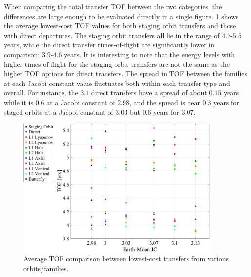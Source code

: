 When comparing the total transfer TOF between the two categories, the differences are large enough
to be evaluated directly in a single figure. \cref{fig:compareTOF} shows the average lowest-cost
TOF values for both staging orbit transfers and those with direct departures. The staging orbit
transfers all lie in the range of $4.7$-$5.5$ years, while the direct transfer times-of-flight are
significantly lower in comparison: $3.9$-$4.6$ years. It is interesting to note that the energy
levels with higher times-of-flight for the staging orbit transfers are not the same as the higher
TOF options for direct transfers. The spread in TOF between the families at each Jacobi constant
value fluctuates both within each transfer type and overall. For instance, the $3.1$ direct
transfers have a spread of about $0.15$ years while it is $0.6$ at a Jacobi constant of $2.98$, and
the spread is near $0.3$ years for staged orbits at a Jacobi constant of $3.03$ but $0.6$ years for
$3.07$.

\begin{figure}[!htb]
    \centering
    \includegraphics[width=0.9\textwidth]{figures/TOFComparison.pdf}
    \caption{Average TOF comparison between lowest-cost transfers from various orbits/families.}
    \label{fig:compareTOF}
\end{figure}

